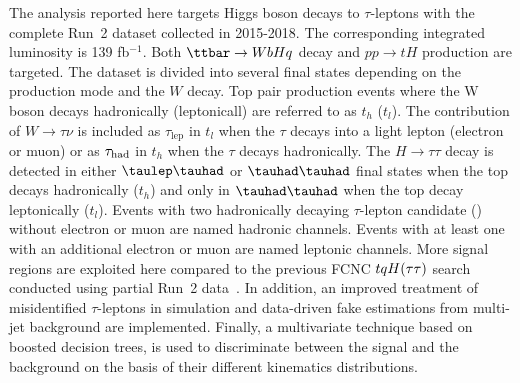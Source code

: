 
The analysis reported here targets Higgs boson decays to 
$\tau$-leptons with the complete Run~2 dataset collected in 2015-2018. The corresponding integrated luminosity is 139 fb$^{-1}$. Both $\ttbar \to WbHq$ decay and $pp \to tH$ production are targeted. The dataset is divided into several final states depending on the production mode and
the  $W$ decay. Top pair production events where the W boson decays hadronically (leptonicall) are referred to as $t_h$ ($t_l$). The contribution of 
$W\rightarrow\tau\nu$ is included as $\tau_{\text{lep}}$ in $t_l$ when the $\tau$ decays into a light lepton (electron or muon) or as $\tau_\text{had}$ 
in $t_h$ when the $\tau$ decays hadronically.
The $H\rightarrow \tau\tau$ decay is detected in
either $\tlhad$ or $\thadhad$ final states when the top decays hadronically ($t_h$) and only in $\thadhad$ when the top decay leptonically ($t_l$). 
Events with two hadronically decaying $\tau$-lepton candidate (\tauhad) without electron or muon are named hadronic channels. Events with at least one \tauhad with an additional electron or muon are named leptonic channels. More signal regions are exploited here compared to the previous FCNC $tqH(\tau\tau)$ search conducted using partial Run~2 data~\cite{fcnc36}.
In addition, an improved treatment of misidentified $\tau$-leptons in simulation and data-driven
fake estimations from multi-jet background are implemented.
Finally, a multivariate technique based on boosted decision trees, is used to discriminate between the signal and the background on the basis of their different kinematics distributions. 

